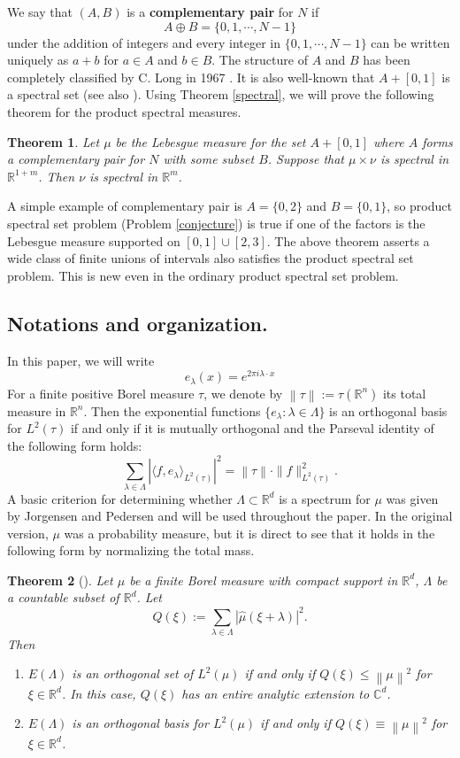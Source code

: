 \documentclass[reqno,a4paper,12pt]{amsart}
\numberwithin{equation}{section}
\newcommand{\R}{{\mathbb R}}
\newcommand{\C}{{\mathcal C}}
\newcommand{\Norm}[1]{{\left\|{#1}\right\|}}
\newcounter{rem}
\newtheorem{theorem}{Theorem}[section]
\theoremstyle{remark}
\numberwithin{equation}{section}
\def\R{\mathbb{R}}
\def\C{\mathbb{C}}
\begin{document}
We say that $(A,B)$ is a {\bf complementary pair} for $N$ if 
$$
A\oplus B = \{0,1,\cdots, N-1\}
$$
under the addition of integers and every integer in $\{0,1,\cdots, N-1\}$ can be written uniquely as $a+b$ for $a\in A$ and $b\in B$. The structure of $A$ and $B$ has been completely classified by C. Long in 1967 \cite{Long} . It is also well-known that $A+[0,1]$ is a spectral set (see also \cite{GL-2014,PW}).  Using  Theorem \ref{spectral}, we will prove the following theorem for the product spectral measures. 
\begin{theorem}\label{product-tiling interval-intro}
    Let $\mu$ be the Lebesgue measure for the set $A+[0,1]$ where $A$ forms a complementary pair for $N$ with some subset $B$. Suppose that $\mu\times \nu$ is spectral {in $\R^{1+m}$}. Then $\nu$ is spectral in $\R^{m}$.
\end{theorem}

A simple example of complementary pair  is $A = \{0,2\}$ and $B = \{0,1\}$, so product spectral set problem (Problem \ref{conjecture}) is true if one of the factors is the Lebesgue measure supported on $[0,1]\cup [2,3]$. The above theorem asserts a wide class of finite unions of intervals also satisfies the product spectral set problem. This is new even in the ordinary product spectral set problem. 



\subsection{Notations and organization.} In this paper, we will  write 
$$
e_{\lambda}(x) = e^{2\pi i \lambda\cdot x}
$$
{For a finite positive Borel measure $\tau $, we denote by $\Norm{\tau }:=\tau(\R^n)$ its total measure in $\R^n$. Then the exponential functions $\{e_{\lambda}:\lambda\in \Lambda\}$ is an orthogonal basis for $L^2(\tau)$ if and only if it is mutually orthogonal and the Parseval identity of the following form holds:}
$$
\sum_{\lambda\in\Lambda}|\langle f,e_{\lambda}\rangle_{L^2(\tau)}|^2=\Norm{\tau}\cdot\|f\|_{L^2(\tau)}^2.
$$
A basic criterion for determining whether $\Lambda\subset\mathbb{R}^{d}$ is a spectrum for $\mu$ was given by Jorgensen and Pedersen \cite{dense} and will be used throughout the paper. In the original version, $\mu$ was a probability measure,  but it is direct to see that it holds in the following form by normalizing the total mass. 
\begin{theorem}[\cite{dense}]\label{Q}
Let $\mu$ be a finite Borel measure with compact support in $\mathbb{R}^{d}$, $\Lambda$ be a countable subset of $\mathbb{R}^{d}$. Let
\[
Q(\xi):=\sum_{\lambda\in \Lambda}|\hat{\mu}(\xi+\lambda)|^{2}.
\]
 Then
\begin{enumerate}
  \item [\textup{(1)}] $E(\Lambda)$ is an orthogonal set of $L^{2}(\mu)$ if and only if $Q(\xi)\leq \Norm{\mu}^2$ for $\xi \in \mathbb{R}^{d}$. In this case, $Q(\xi)$ has an entire analytic extension to $\C^d$.
\item [\textup{(2)}] $E(\Lambda)$ is an orthogonal basis for $L^{2}(\mu)$ if and only if $Q(\xi)\equiv \Norm{\mu}^2$ for $\xi \in \mathbb{R}^{d}$.
\end{enumerate}
\end{theorem}
\end{document}
